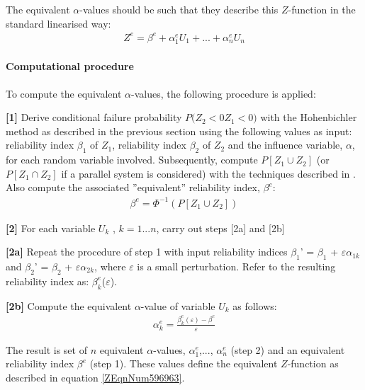 The equivalent $\alpha$-values should be such that they describe this $Z$-function in the standard linearised way: 
\begin{align}
Z^{e} =\beta ^{e} +\alpha _{1}^{e} U_{1} +...+\alpha _{n}^{e} U_{n} \label{ZEqnNum596963} 
\end{align}

\paragraph*{Computational procedure}

To compute the equivalent $\alpha$-values, the following procedure is applied:

\textbf{[1]} Derive conditional failure probability $P(Z_2<0$\textbar $Z_1<0)$ with the Hohenbichler method as described in the previous section using the following values as input: reliability index $\beta_1$ of $Z_1$, reliability index $\beta_2$ of $Z_2$ and the influence variable, $\alpha $, for each random variable involved. Subsequently, compute $P[Z_1\cup Z_2]$ (or $P[Z_1\cap Z_2]$ if a parallel system is considered) with the techniques described in . Also compute the associated ''equivalent'' reliability index, $\beta^e$:
\begin{align}
\beta ^{e} =\Phi ^{-1} \left(P\left[Z_{1} \cup Z_{2} \right]\right)\label{ZEqnNum851771} 
\end{align}

\textbf{[2]} For each variable $U_k$ , $k=1...n$, carry out steps [2a] and [2b]

\textbf{[2a]} Repeat the procedure of step 1 with input reliability indices $\beta_1$' = $\beta_1$ + $\varepsilon$$\alpha_{1k}$ and $\beta_2$' = $\beta_2$ + $\varepsilon$$\alpha_{2k}$, where $\varepsilon$ is a small perturbation. Refer to the resulting reliability index as: $\beta_k^e$($\varepsilon$).

\textbf{[2b]} Compute the equivalent $\alpha$-value of variable $U_k$ as follows:
\begin{align}
\alpha _{k}^{e} =\frac{\beta _{k}^{e} \left(\varepsilon \right)-\beta ^{e} }{\varepsilon } \label{ZEqnNum303161} 
\end{align}

The result is set of $n$ equivalent $\alpha $-values, $\alpha_1^e$,..., $\alpha_n^e$ (step 2) and an equivalent reliability index $\beta^e$ (step 1). These values define the equivalent $Z$-function as described in equation \eqref{ZEqnNum596963}.

